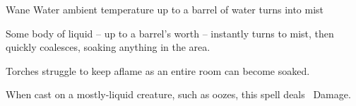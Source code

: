   {}%
  {Wane}%
  {Water}%
  {ambient temperature}%
  {up to a barrel of water turns into mist}%
  {
    Some body of liquid -- up to a barrel's worth -- instantly turns to mist, then quickly coalesces, soaking anything in the area.

    Torches struggle to keep aflame as an entire room can become soaked.

    When cast on a mostly-liquid creature, such as oozes, this spell deals \rollConv~Damage.
  }

